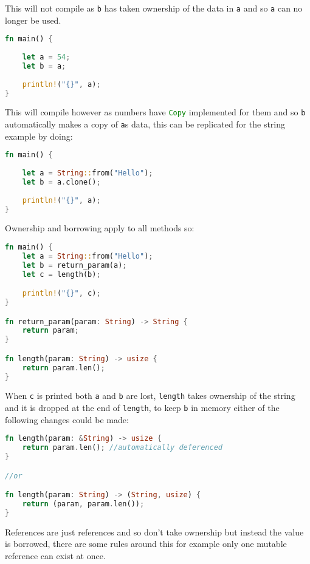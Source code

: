 \documentclass[a4paper,11pt]{article}
\begin{document}
This will not compile as \lstinline{b} has taken ownership of the data in \lstinline{a} and so \lstinline{a} can no longer be used.

\begin{lstlisting}[language=Rust,frame=single]
fn main() {
    
    let a = 54;
    let b = a;
    
    println!("{}", a);
}
\end{lstlisting}

This will compile however as numbers have \lstinline[language=Rust]{Copy} implemented for them and so \lstinline{b} automatically makes a copy of \lstinline{a}s data, this can be replicated for the string example by doing:

\begin{lstlisting}[language=Rust,frame=single]
fn main() {
    
    let a = String::from("Hello");
    let b = a.clone();
    
    println!("{}", a);
}
\end{lstlisting}
\newpage
Ownership and borrowing apply to all methods so:

\begin{lstlisting}[language=Rust,frame=single]
fn main() {
    let a = String::from("Hello");
    let b = return_param(a);
    let c = length(b);

    println!("{}", c);
}

fn return_param(param: String) -> String {
	return param;
}

fn length(param: String) -> usize {
	return param.len();
}
\end{lstlisting}

When \lstinline{c} is printed both \lstinline{a} and \lstinline{b} are lost, \lstinline{length} takes ownership of the string and it is dropped at the end of \lstinline{length}, to keep \lstinline{b} in memory either of the following changes could be made:
\begin{lstlisting}[language=Rust,frame=single]
fn length(param: &String) -> usize {
	return param.len(); //automatically deferenced
}

//or

fn length(param: String) -> (String, usize) {
	return (param, param.len()); 
}
\end{lstlisting}

References are just references and so don't take ownership but instead the value is borrowed, there are some rules around this for example only one mutable reference can exist at once.
\end{document}
